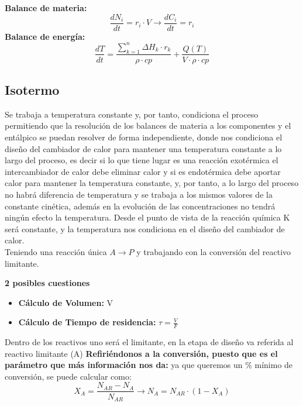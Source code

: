 \begin{raggedright}
    \textbf{Balance de materia:}
    \begin{equation}
        \frac{dN_i}{dt} = r_i \cdot V \rightarrow \frac{dC_i}{dt} = r_i
    \end{equation}
    \textbf{Balance de energía:}
    \begin{equation}
        \frac{dT}{dt} = \frac{\sum_{k=1}^{n} \Delta H_k \cdot r_k}{\rho \cdot cp} + \frac{Q(T)}{V \cdot \rho \cdot cp}
    \end{equation}
    \subsection{Isotermo}
    \begin{raggedright}
        Se trabaja a temperatura constante y, por tanto, condiciona el proceso permitiendo que la resolución de los balances de materia a los componentes y el entálpico se puedan
        resolver de forma independiente, donde nos condiciona el diseño del cambiador de calor para mantener una temperatura constante a lo largo del proceso, es decir si lo que tiene lugar
        es una reacción exotérmica el intercambiador de calor debe eliminar calor y si es endotérmica debe aportar calor para mantener la temperatura constante, y, por tanto,
        a lo largo del proceso no habrá diferencia de temperatura y se trabaja a los mismos valores de la constante cinética, además en la evolución de las concentraciones no tendrá ningún efecto la temperatura.
        Desde el punto de vista de la reacción química K será constante, y la temperatura nos condiciona en el diseño del cambiador de calor.\\
        \vspace{1\baselineskip}
        Teniendo una reacción única $A \rightarrow P$ y trabajando con la conversión del reactivo limitante.

    \end{raggedright}\vspace{1\baselineskip}

    \textbf{2 posibles cuestiones}
    \hypertarget{tau}{\rule{0pt}{0pt}}
    \begin{itemize}
        \item \textbf{Cálculo de Volumen:} V
        \item \textbf{Cálculo de Tiempo de residencia:} $\tau = \frac{V}{F}$
    \end{itemize}
    \newpage
    Dentro de los reactivos uno será el limitante, en la etapa de diseño va referida al reactivo limitante (A)
    \textbf{Refiriéndonos a la conversión, puesto que es el parámetro que más información nos da:}
    ya que queremos un $\%$ mínimo de conversión, se puede calcular como:
    \begin{equation}
        X_A = \frac{N_{AR}-N_A}{N_{AR}} \rightarrow N_A = N_{AR} \cdot (1-X_A)
    \end{equation}


\end{raggedright}
